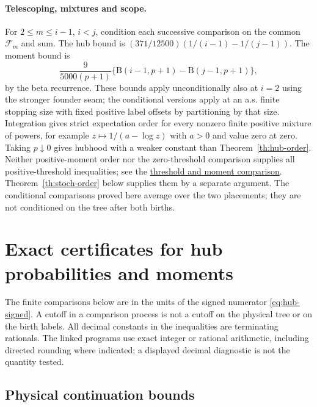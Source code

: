 \documentclass[11pt]{article}
\newcommand{\proofsrc}[2]{\href{https://github.com/uzay-eth/friend-tree-exponent/blob/a0972085ad72ad5685ae7b424988648d1965e73c/#1}{#2}}
\newcommand{\sectag}[1]{\renewcommand{\thesection}{#1}\renewcommand{\theHsection}{#1}}
\theoremstyle{remark}
\numberwithin{equation}{section}
\begin{document}
\paragraph{Telescoping, mixtures and scope.}
For $2\le m\le i-1$, $i<j$, condition each successive comparison on the common $\mathcal F_m$ and sum. The hub bound is $(371/12500)(1/(i-1)-1/(j-1))$. The moment bound is
\[
 \frac{9}{5000(p+1)}\{\mathrm B(i-1,p+1)-\mathrm B(j-1,p+1)\},
\]
by the beta recurrence. These bounds apply unconditionally also at $i=2$ using the stronger founder seam; the conditional versions apply at an a.s. finite stopping size with fixed positive label offsets by partitioning by that size. Integration gives strict expectation order for every nonzero finite positive mixture of powers, for example $z\mapsto1/(a-\log z)$ with $a>0$ and value zero at zero. Taking $p\downarrow0$ gives hubhood with a weaker constant than Theorem~\ref{th:hub-order}. Neither positive-moment order nor the zero-threshold comparison supplies all positive-threshold inequalities; see the \proofsrc{round2/proofs/astra-late/source/round2/open/age-order/hub-ranking/beta-tests/README.md}{threshold and moment comparison}. Theorem~\ref{th:stoch-order} below supplies them by a separate argument. The conditional comparisons proved here average over the two placements; they are not conditioned on the tree after both births.

\sectag{CERT}
\section{Exact certificates for hub probabilities and moments}\label{app:hub-certificates}
The finite comparisons below are in the units of the signed numerator \eqref{eq:hub-signed}. A cutoff in a comparison process is not a cutoff on the physical tree or on the birth labels. All decimal constants in the inequalities are terminating rationals. The linked programs use exact integer or rational arithmetic, including directed rounding where indicated; a displayed decimal diagnostic is not the quantity tested.

\subsection{Physical continuation bounds}
\end{document}
